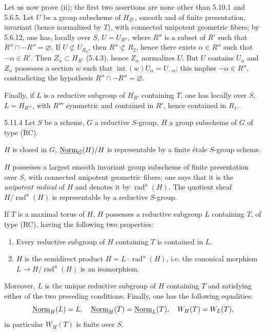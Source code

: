 Let us now prove (ii); the first two assertions are none other than 5.10.1 and 5.6.5. Let $U$ be a group subscheme of $H_{R'}$, smooth and of finite presentation, invariant (hence normalized by $T$), with connected unipotent geometric fibers; by 5.6.12, one has, locally over $S$, $U=U_{R''}$, where $R''$ is a subset of $R'$ such that $R''\cap-R''=\varnothing$. If $U\not\subset U_{R_2}$, then $R''\not\subset R_2$, hence there exists $\alpha\in R''$ such that $-\alpha\in R'$. Then $Z_\alpha\subset H_{R'}$ (5.4.3), hence $Z_\alpha$ normalizes $U$. But $U$ contains $U_\alpha$ and $Z_\alpha$ possesses a section $w$ such that $\operatorname{int}(w)U_\alpha=U_{-\alpha}$; this implies $-\alpha\in R''$, contradicting the hypothesis $R''\cap-R''=\varnothing$.

Finally, if $L$ is a reductive subgroup of $H_{R'}$ containing $T$, one has locally over $S$, $L=H_{R'''}$, with $R'''$ symmetric and contained in $R'$, hence contained in $R_1$.
\begin{proposition}{5.11.4}\label{XXII.5.11.4}
Let $S$ be a scheme, $G$ a reductive $S$-group, $H$ a group subscheme of $G$ of type (RC).
\begin{enumeratei}
\item $H$ is closed in $G$, $\underline{\mathrm{Norm}}_G(H)/H$ is representable by a finite \'etale $S$-group scheme.
\item $H$ possesses a largest smooth invariant group subscheme of finite presentation over $S$, with connected unipotent geometric fibers; one says that it is the \emph{unipotent radical} of $H$ and denotes it by $\operatorname{rad}^u(H)$. The quotient sheaf $H/\operatorname{rad}^u(H)$ is representable by a reductive $S$-group.
\item If $T$ is a maximal torus of $H$, $H$ possesses a reductive subgroup $L$ containing $T$, of type (RC), having the following two properties:
\begin{enumerate}[label=\textup{(\alph*)}]
\item Every reductive subgroup of $H$ containing $T$ is contained in $L$.
\item $H$ is the semidirect product $H=L\cdot\operatorname{rad}^u(H)$, i.e. the canonical morphism $L\to H/\operatorname{rad}^u(H)$ is an isomorphism.
\end{enumerate}
\end{enumeratei}
Moreover, $L$ is the unique reductive subgroup of $H$ containing $T$ and satisfying either of the two preceding conditions. Finally, one has the following equalities:
\[
\underline{\mathrm{Norm}}_H(L)=L,\quad\underline{\mathrm{Norm}}_H(T)=\underline{\mathrm{Norm}}_L(T),\quad W_H(T)=W_L(T),
\]
in particular $W_H(T)$ is finite over $S$.
\end{proposition}
